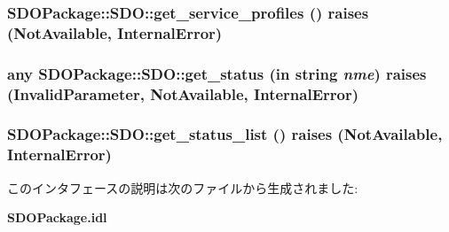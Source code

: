 \subsubsection[{get\_\-service\_\-profiles}]{ SDOPackage::SDO::get\_\-service\_\-profiles ()  raises (NotAvailable, InternalError)}\label{interfaceSDOPackage_1_1SDO_af455c384fa54ab6872d28db1baec3a1d}
\subsubsection[{get\_\-status}]{\setlength{\rightskip}{0pt plus 5cm}any SDOPackage::SDO::get\_\-status (in string {\em nme})  raises (InvalidParameter, NotAvailable, InternalError)}\label{interfaceSDOPackage_1_1SDO_a2655f624a38b590593154c8a8c11e6e8}
\subsubsection[{get\_\-status\_\-list}]{ SDOPackage::SDO::get\_\-status\_\-list ()  raises (NotAvailable, InternalError)}\label{interfaceSDOPackage_1_1SDO_ae019ba73a5675a871701153bc56db14c}


このインタフェースの説明は次のファイルから生成されました:\begin{DoxyCompactItemize}
\item 
{\bf SDOPackage.idl}\end{DoxyCompactItemize}
